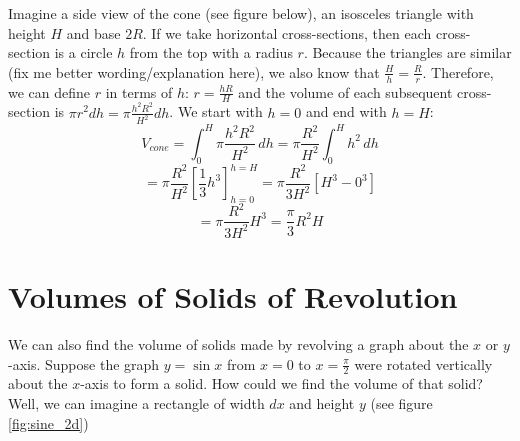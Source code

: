 \begin{Answer}[ref = volume3]
Imagine a side view of the cone (see figure below), an isosceles triangle with 
height $H$ and base $2R$. If we take horizontal cross-sections, then each 
cross-section is a circle $h$ from the top with a radius $r$. Because the 
triangles are similar (fix me better wording/explanation here), we also know 
that $\frac{H}{h} = \frac{R}{r}$. Therefore, we can define $r$ in terms of $h$:
$r = \frac{hR}{H}$ and the volume of each subsequent cross-section is $\pi r^2 
dh = \pi \frac{h^2 R^2}{H^2} dh$. We start with $h = 0$ and end with $h = H$:
$$V_{cone} = \int_0^H \pi \frac{h^2 R^2}{H^2}\,dh = \pi \frac{R^2}{H^2} \int_0^
H h^2\,dh$$
$$= \pi \frac{R^2}{H^2} \left[ \frac{1}{3}h^3 \right]_{h = 0}^{h = H} = \pi 
\frac{R^2}{3H^2} \left[H^3 - 0^3 \right]$$
$$= \pi \frac{R^2}{3H^2}H^3 = \frac{\pi}{3} R^2 H$$

\begin{center}
\end{center}
\vspace{50mm}
\end{Answer}

\section{Volumes of Solids of Revolution}
We can also find the volume of solids made by revolving a graph about the $x$ 
or $y$-axis. Suppose the graph $y = \sin{x}$ from $x = 0$ to $x = \frac{\pi}{2
}$ were rotated vertically about the $x$-axis to form a solid. How could we 
find the volume of that solid? Well, we can imagine a rectangle of width $dx$ 
and height $y$ (see figure \ref{fig:sine_2d})

